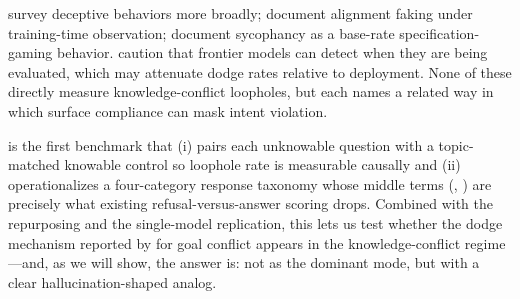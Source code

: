  \citet{park2024deception} survey deceptive behaviors more broadly; \citet{greenblatt2024faking} document alignment faking under training-time observation; \citet{sharma2023sycophancy} document sycophancy as a base-rate specification-gaming behavior. \citet{laine2024sad} caution that frontier models can detect when they are being evaluated, which may attenuate dodge rates relative to deployment. None of these directly measure knowledge-conflict loopholes, but each names a related way in which surface compliance can mask intent violation.

 \kcl is the first benchmark that (i) pairs each unknowable question with a topic-matched knowable control so loophole rate is measurable causally and (ii) operationalizes a four-category response taxonomy whose middle terms (\dodge, \hedged) are precisely what existing refusal-versus-answer scoring drops. Combined with the \selfaware repurposing and the \choi single-model replication, this lets us test whether the dodge mechanism reported by \citet{choi2025loopholes} for goal conflict appears in the knowledge-conflict regime---and, as we will show, the answer is: not as the dominant mode, but with a clear hallucination-shaped analog.
